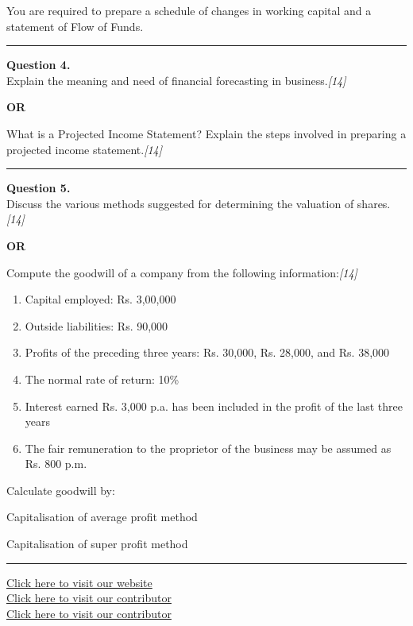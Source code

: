 \documentclass[11pt,a4paper]{article}
\newcommand{\pts}[1]{\hfill   \textit{[#1]}}
\begin{document}
You are required to prepare a schedule of changes in working capital and a statement of Flow of Funds.

\medskip\rule{\linewidth}{0.2pt}




\noindent   \textbf{Question 4.} \\
Explain the meaning and need of financial forecasting in business.\pts{14}

\centerline{   \textbf{OR}}

What is a Projected Income Statement? Explain the steps involved in preparing a projected income statement.\pts{14}

\medskip\rule{\linewidth}{0.2pt}




\noindent   \textbf{Question 5.} \\
Discuss the various methods suggested for determining the valuation of shares.\pts{14}

\centerline{   \textbf{OR}}

Compute the goodwill of a company from the following information:\pts{14}

\begin{enumerate}[label=(\roman*),itemsep=2pt,topsep=2pt]
  \item Capital employed: Rs. 3,00,000
  \item Outside liabilities: Rs. 90,000
  \item Profits of the preceding three years: Rs. 30,000, Rs. 28,000, and Rs. 38,000
  \item The normal rate of return: 10\%
  \item Interest earned Rs. 3,000 p.a. has been included in the profit of the last three years
  \item The fair remuneration to the proprietor of the business may be assumed as Rs. 800 p.m.
\end{enumerate}

Calculate goodwill by:

\begin{parts}
  \item Capitalisation of average profit method
  \item Capitalisation of super profit method
\end{parts}

\vfill
\rule{\linewidth}{0.4pt}

\begin{center}\small
\href{https://bhu-exam.vercel.app/}{Click here to visit our website}\\[4pt]
\href{https://me-aryan.vercel.app/}{Click here to visit our contributor}\\[4pt]
\href{https://quashan-me.vercel.app/}{Click here to visit our contributor}
\end{center}
\end{document}
